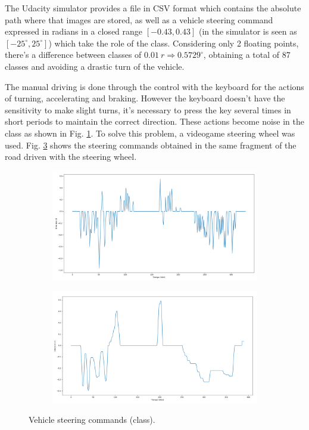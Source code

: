 \documentclass[conference]{IEEEtran}
\begin{document}
The Udacity simulator provides a file in CSV format which contains the absolute path where that images are stored, as well as a vehicle steering command expressed in radians in a closed range $[-0.43, 0.43]$ (in the simulator is seen as $[-25^\circ, 25^\circ]$) which take the role of the class. Considering only 2 floating points, there's a difference between classes of $0.01\ r \Rightarrow 0.5729^\circ$, obtaining a total of 87 classes and avoiding a drastic turn of the vehicle.

The manual driving is done through the control with the keyboard for the actions of turning, accelerating and braking. However the keyboard doesn't have the sensitivity to make slight turns, it's necessary to press the key several times in short periods to maintain the correct direction. These actions become noise in the class as shown in Fig. \ref{subfig:key}. To solve this problem, a videogame steering wheel was used. Fig. \ref{subfig:joy} shows the steering commands obtained in the same fragment of the road driven with the steering wheel.

\begin{figure}[h]
	\centering
	\begin{subfigure}{0.4\textwidth} 
		\includegraphics[width=\textwidth]{img/keyboard}
		\label{subfig:key}
	\end{subfigure}
	\begin{subfigure}{0.4\textwidth} 
		\includegraphics[width=\textwidth]{img/joystick}
		\label{subfig:joy}
	\end{subfigure}
	\caption{Vehicle steering commands (class).} 
\end{figure}
\end{document}
